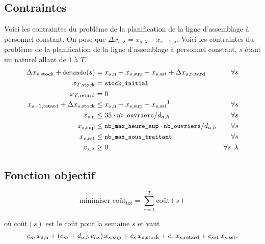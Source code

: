 \subsection*{Contraintes}
Voici les contraintes du problème de la planification
de la ligne d’assemblage à personnel constant.
On pose que $\Delta x_{s,\lambda} = x_{s,\lambda} - x_{s-1,\lambda}$.
Voici les contraintes du problème de la planification 
de la ligne d’assemblage à personnel constant, $s$ étant un naturel allant de $1$ à $T$.
\begin{align*}
  \Delta\xstock + \texttts{demande}(s) &= \xn + \xsup
   + \xsst + \Delta\xretard &\forall s \\
  \myX{T}{stock} &= \texttts{stock\_initial} \\
  \myX{T}{retard}&= 0 \\
  \myX{s-1}{retard} + \Delta\xstock &\leq \xn + \xsup + \xsst \text{\footnotemark} &\forall s \\
  \xn &\leq 35\cdot \texttts{nb\_ouvriers}/ d_{a,h}
  &\forall s \\
  \xsup &\leq \texttts{nb\_max\_heure\_sup}\cdot\texttts{nb\_ouvriers}/ d_{a,h}
  &\forall s \\
  \xsst &\leq \texttts{nb\_max\_sous\_traitant} &\forall s \\
  x_{s,\lambda} &\geq 0 &\forall s,\lambda \\
\end{align*}

\subsection*{Fonction objectif}
\[ \text{minimiser } \text{coût}_\text{tot} = \sum_{s=1}^{T} \text{coût}(s) \]

où coût$(s)$ est le coût pour la semaine $s$ et vaut
\[
  c_m\, x_{s,\text{n}} + (c_m + d_{a,h} \, c_{hs})\, x_{s,\text{sup}}
  + c_s\, x_{s,\text{stock}} + c_r\, x_{s,\text{retard}} + c_{sst}\, x_{s,\text{sst}}.
\]

